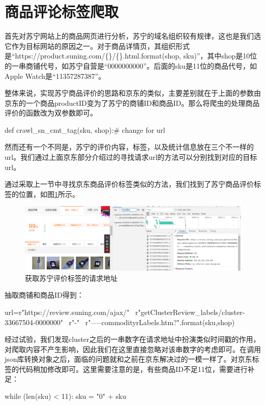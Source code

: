 \section{商品评论标签爬取}

首先对苏宁网站上的商品网页进行分析，苏宁的域名组织较有规律，这也是我们选它作为目标网站的原因之一。对于商品详情页，其组织形式是“https://product.suning.com/\{\}/\{\}.html.format(shop, sku)”，其中shop是10位的一串商铺代号，如苏宁自营是“0000000000”。后面的sku是11位的商品代号，如Apple Watch是“11357287387”。

整体来说，实现苏宁商品评价的思路和京东的类似，主要差别就在于上面的参数由京东的一个商品productID变为了苏宁的商铺ID和商品ID。那么将爬虫的处理商品评价的函数改为双参数即可。
\begin{python}
def crawl_sn_cmt_tag(sku, shop):# change for url
\end{python}

然而还有一个不同是，苏宁的评价内容，标签，以及统计信息放在三个不一样的url。我们通过上面京东部分介绍过的寻找请求url的方法可以分别找到对应的目标url。

通过采取上一节中寻找京东商品评价标签类似的方法，我们找到了苏宁商品评价标签的位置，如图\ref{img:yhb111}所示。

\begin{figure}[htbp]
\centering
\includegraphics[width=13.5cm]{img/yhb/sn_eg2.png}
\caption{获取苏宁评价标签的请求地址}
\label{img:yhb111}   %
\end{figure}

抽取商铺和商品ID得到：
\begin{python}
url=r"https://review.suning.com/ajax/" \
        r"getClusterReview_labels/cluster-33667504-0000000" \
        r"{}-{}" \
        r"-----commodityrLabels.htm?".format(sku,shop)
\end{python}


经过试验，我们发现cluster之后的一串数字在请求地址中扮演类似时间戳的作用，对爬取内容不产生影响，因此我们在这里直接忽略对该串数字的考虑即可。在调用json库转换对象之后，面临的问题就和之前在京东解决过的一模一样了。对京东标签的代码稍加修改即可。这里需要注意的是，有些商品ID不足11位，需要进行补足：
\begin{python}
while (len(sku) < 11):
                sku = "0" + sku
\end{python}


